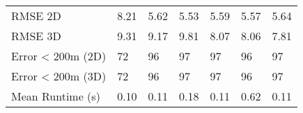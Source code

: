 \begin{longtable}{lllllll}
RMSE 2D           &       8.21 &       5.62 &      5.53 &    5.59 &     5.57 &        5.64 \\
RMSE 3D           &       9.31 &       9.17 &      9.81 &    8.07 &     8.06 &        7.81 \\
Error < 200m (2D) &         72 &         96 &        97 &      97 &       96 &          97 \\
Error < 200m (3D) &         72 &         96 &        97 &      97 &       96 &          97 \\
Mean Runtime (s)  &       0.10 &       0.11 &      0.18 &    0.11 &     0.62 &        0.11 \\
\end{longtable}
